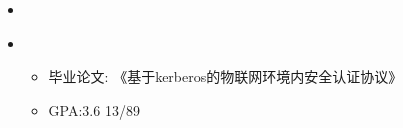   \begin{itemize}[leftmargin=*]
    \item
      {\small
      }
    \item
      {\small
      \begin{itemize}
        \item 毕业论文: 《基于kerberos的物联网环境内安全认证协议》
        \item GPA:3.6 13/89
      \end{itemize}
      }
  \end{itemize}